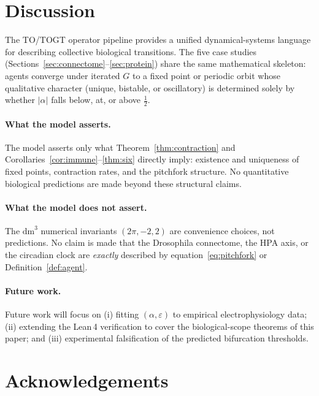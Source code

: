 \documentclass[12pt,a4paper]{article}
\newcommand{\dmcube}{\mathrm{dm}^3}
\begin{document}
\section{Discussion}
\label{sec:discussion}

The TO/TOGT operator pipeline provides a unified dynamical-systems language for
describing collective biological transitions.  The five case studies
(Sections~\ref{sec:connectome}–\ref{sec:protein}) share the same mathematical
skeleton: agents converge under iterated $G$ to a fixed point or periodic orbit
whose qualitative character (unique, bistable, or oscillatory) is determined
solely by whether $|\alpha|$ falls below, at, or above $\tfrac{1}{2}$.

\paragraph{What the model asserts.}
The model asserts only what Theorem~\ref{thm:contraction} and
Corollaries~\ref{cor:immune}–\ref{thm:six} directly imply: existence and
uniqueness of fixed points, contraction rates, and the pitchfork structure.  No
quantitative biological predictions are made beyond these structural claims.

\paragraph{What the model does not assert.}
The $\dmcube$ numerical invariants $(2\pi, -2, 2)$ are convenience choices, not
predictions.  No claim is made that the Drosophila connectome, the HPA axis, or
the circadian clock are \emph{exactly} described by equation~\eqref{eq:pitchfork}
or Definition~\ref{def:agent}.

\paragraph{Future work.}
Future work will focus on (i) fitting $(\alpha, \varepsilon)$ to empirical
electrophysiology data; (ii) extending the Lean\,4 verification to cover the
biological-scope theorems of this paper; and (iii) experimental falsification of
the predicted bifurcation thresholds.

\section*{Acknowledgements}
\end{document}
